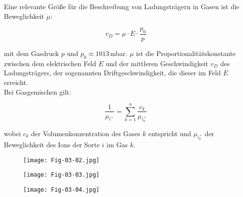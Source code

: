 Eine relevante Größe für die Beschreibung von Ladungsträgern in Gasen ist die Beweglichkeit $\mu$:

\[v_D = \mu\cdot E \cdot \frac{p_0}{p}  \]

mit dem Gasdruck $p$ und $p_0\approx 1013\,$mbar. $\mu$ ist die Proportionalitätskonstante zwischen
dem elektrischen Feld $E$ und der mittleren Geschwindigkeit $v_D$ des Ladungsträgers, der
sogenannten Driftgeschwindigkeit, die dieser im Feld $E$ erreicht.
\\
Bei Gasgemischen gilt:

\[\frac{1}{\mu_{i^+}} = \sum_{k=1}^n \frac{c_k}{\mu_{i^+_k}}  \]

wobei $c_k$ der Volumenkonzentration des Gases $k$ entspricht und $\mu_{i^+_k}$ der Beweglichkeit
des Ions der Sorte $i$ im Gas $k$.

\begin{figure}[H]
	\centering
	\texttt{[image: Fig-03-02.jpg]}
\end{figure}

\begin{figure}[H]
	\centering
	\texttt{[image: Fig-03-03.jpg]}
\end{figure}

\begin{figure}[H]
	\centering
	\texttt{[image: Fig-03-04.jpg]}
\end{figure}

